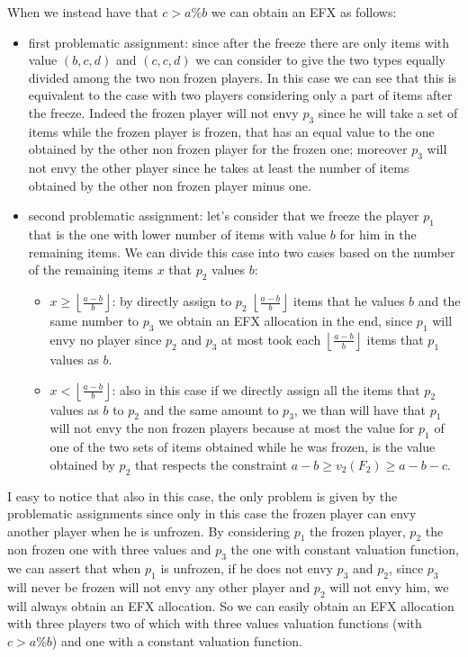 \documentclass{article}
\begin{document}
When we instead have that $c> a\%b$ we can obtain an EFX as follows:
\begin{itemize}
    \item first problematic assignment: since after the freeze there are only items with value $(b,c,d)$ and $(c,c,d)$ we can consider to give the two types equally divided among the two non frozen players. In this case we can see that this is equivalent to the case with two players considering only a part of items after the freeze. Indeed the frozen player will not envy $p_3$ since he will take a set of items while the frozen player is frozen, that has an equal value to the one obtained by the other non frozen player for the frozen one; moreover $p_3$ will not envy the other player since he takes at least the number of items obtained by the other non frozen player minus one.
    \item second problematic assignment: let's consider that we freeze the player $p_1$ that is the one with lower number of items with value $b$ for him in the remaining items. We can divide this case into two cases based on the number of the remaining items $x$ that $p_2$ values $b$: \begin{itemize}
        \item $x \ge \left \lfloor \frac{a-b}{b}\right\rfloor$: by directly assign to $p_2$ $\left \lfloor \frac{a-b}{b}\right\rfloor$ items that he values $b$ and the same number to $p_3$ we obtain an EFX allocation in the end, since $p_1$ will envy no player since $p_2$ and $p_3$ at most took each $\left \lfloor \frac{a-b}{b}\right\rfloor$ items that $p_1$ values as $b$.
        \item $x < \left \lfloor \frac{a-b}{b}\right\rfloor$: also in this case if we directly assign all the items that $p_2$ values as $b$ to $p_2$ and the same amount to $p_3$, we than will have that $p_1$ will not envy the non frozen players because at most the value for $p_1$ of one of the two sets of items obtained while he was frozen, is the value obtained by $p_2$ that respects the constraint $a-b\ge v_2(F_2)\ge a-b-c$.
    \end{itemize}
\end{itemize}
I easy to notice that also in this case, the only problem is given by the problematic assignments since only in this case the frozen player can envy another player when he is unfrozen. By considering $p_1$ the frozen player, $p_2$ the non frozen one with three values and $p_3$ the one with constant valuation function, we can assert that when $p_1$ is unfrozen, if he does not envy $p_3$ and $p_2$, since $p_3$ will never be frozen will not envy any other player and $p_2$ will not envy him, we will always obtain an EFX allocation.
So we can easily obtain an EFX allocation with three players two of which with three values valuation functions (with $c>a\%b$) and one with a constant valuation function.
\end{document}
